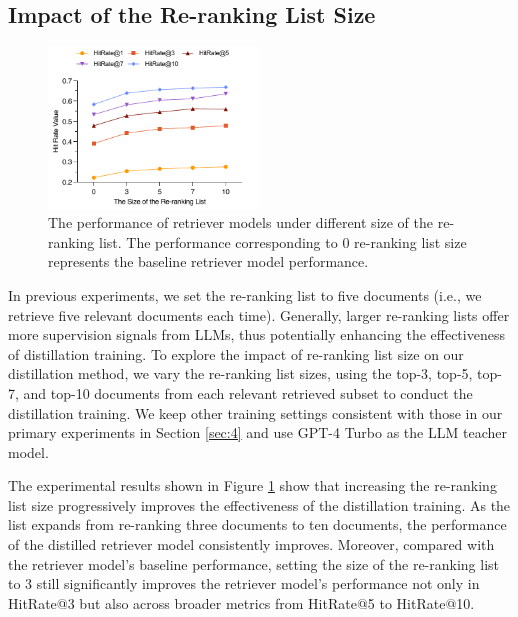 \subsection{Impact of the Re-ranking List Size}
\label{sec:5-4}
\begin{figure}[!htbp]
    \centering
    \includegraphics[width=0.5\textwidth]{latex/pic/fig6.pdf}
    \caption{The performance of retriever models under different size of the re-ranking list. The performance corresponding to 0 re-ranking list size represents the baseline retriever model performance.}
    \label{fig:06}
    \vspace{-4mm}
\end{figure}
In previous experiments, we set the re-ranking list to five documents (i.e., we retrieve five relevant documents each time).
Generally, larger re-ranking lists offer more supervision signals from LLMs, thus potentially enhancing the effectiveness of distillation training. 
To explore the impact of re-ranking list size on our distillation method, we vary the re-ranking list sizes, using the top-3, top-5, top-7, and top-10 documents from each relevant retrieved subset to conduct the distillation training.
We keep other training settings consistent with those in our primary experiments in Section \ref{sec:4} and use GPT-4 Turbo as the LLM teacher model.

The experimental results shown in Figure \ref{fig:06} show that increasing the re-ranking list size progressively improves the effectiveness of the distillation training. 
As the list expands from re-ranking three documents to ten documents, the performance of the distilled retriever model consistently improves.
Moreover, compared with the retriever model's baseline performance, setting the size of the re-ranking list to 3 still significantly improves the retriever model's performance not only in HitRate@3 but also across broader metrics from HitRate@5 to HitRate@10.



